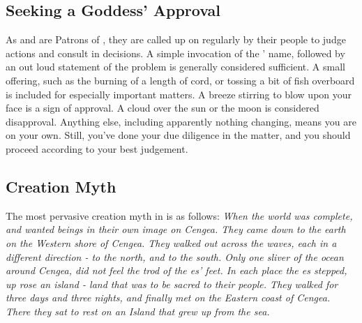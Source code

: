 \documentclass[blue]{GL2020}
\begin{document}
\subsection*{Seeking a Goddess' Approval}
As \cEbb{} and \cFlow{} are Patrons of \pShip{}, they are called up on regularly by their people to judge actions and consult in decisions. A simple invocation of the \cEbb{\God}' name, followed by an out loud statement of the problem is generally considered sufficient. A small offering, such as the burning of a length of cord, or tossing a bit of fish overboard is included for especially important matters. A breeze stirring to blow upon your face is a sign of approval. A cloud over the sun or the moon is considered disapproval. Anything else, including apparently nothing changing, means you are on your own. Still, you've done your due diligence in the matter, and you should proceed according to your best judgement.

\subsection*{Creation Myth}
The most pervasive creation myth in \pShip{} is as follows:
\emph{When the world was complete, \cEbb{} and \cFlow{} wanted beings in their own image on Cengea. They came down to the earth on the Western shore of Cengea. They walked out across the waves, each in a different direction - \cEbb{} to the north, and \cFlow{} to the south. Only one sliver of the ocean around Cengea, \pWod{} did not feel the trod of the \cEbb{\God}es' feet. In each place the \cEbb{\God}es stepped, up rose an island - land that was to be sacred to their people. They walked for three days and three nights, and finally met on the Eastern coast of Cengea. There they sat to rest on an Island that grew up from the sea.}
\end{document}
